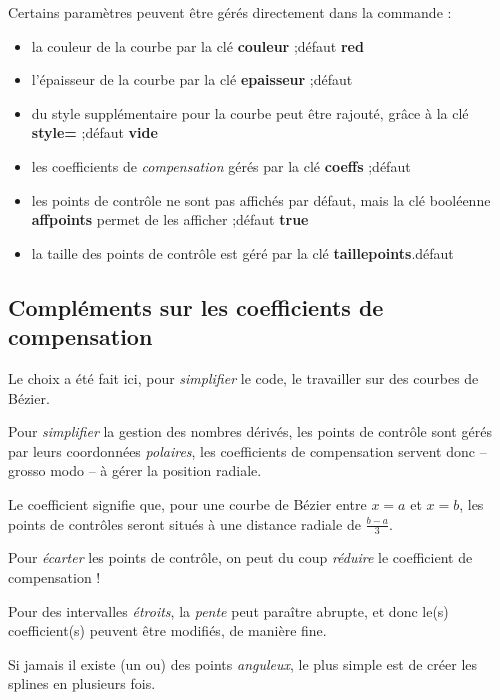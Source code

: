 \documentclass{article}
\newcommand\ctex[1]{\tcbox[vignettelatex]{#1}}
\newcommand\Cle[1]{{\bfseries\sffamily\textlangle #1\textrangle}}
\begin{document}
\begin{codecles}
Certains paramètres peuvent être gérés directement dans la commande \ctex{\textbackslash splinetikz} :
%
\begin{itemize}
	\item la couleur de la courbe par la \textsf{clé} \Cle{couleur} ;\hfill{}défaut \Cle{red}
	\item l'épaisseur de la courbe par la \textsf{clé} \Cle{epaisseur} ;\hfill{}défaut \Cle{1.25pt}
	\item du style supplémentaire pour la courbe peut être rajouté, grâce à la \textsf{clé} \Cle{style=} ;\hfill{}défaut \Cle{vide}
	\item les coefficients de \textit{compensation} gérés par la \textsf{clé} \Cle{coeffs} ;\hfill{}défaut \Cle{3}
	\item les points de contrôle ne sont pas affichés par défaut, mais la \textsf{clé booléenne} \Cle{affpoints} permet de les afficher ;\hfill{}défaut \Cle{true}
	\item la taille des points de contrôle est géré par la \textsf{clé} \Cle{taillepoints}.\hfill{}défaut \Cle{2pt}
\end{itemize}
\end{codecles}

\subsection{Compléments sur les coefficients de \og compensation \fg}

\begin{codeidee}
Le choix a été fait ici, pour \textit{simplifier} le code, le travailler sur des courbes de Bézier.

Pour \textit{simplifier} la gestion des nombres dérivés, les points de contrôle sont gérés par leurs coordonnées \textit{polaires}, les \textsf{coefficients de compensation} servent donc -- grosso modo -- à gérer la position radiale.

\smallskip

Le coefficient \Cle{3} signifie que, pour une courbe de Bézier entre $x=a$ et $x=b$, les points de contrôles seront situés à une distance radiale de $\frac{b-a}{3}$.

Pour \textit{écarter} les points de contrôle, on peut du coup \textit{réduire} le coefficient de compensation !

\medskip

Pour des intervalles \textit{étroits}, la \textit{pente} peut paraître abrupte, et donc le(s) coefficient(s) peuvent être modifiés, de manière fine.

\medskip

Si jamais il existe (un ou) des points \textit{anguleux}, le plus simple est de créer les splines en plusieurs fois.
\end{codeidee}
\end{document}
